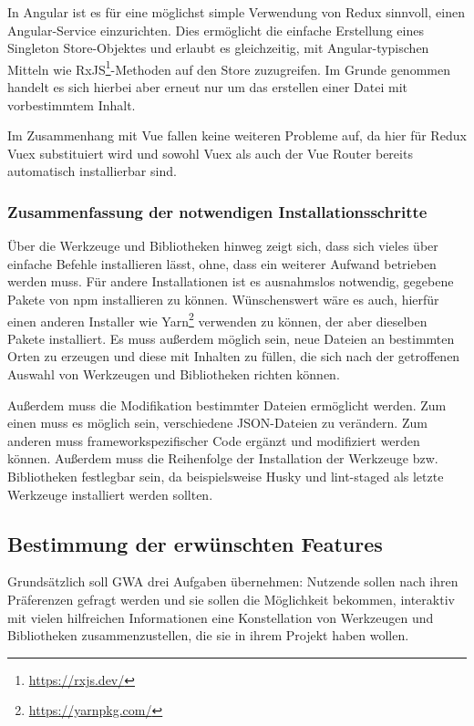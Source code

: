 In Angular ist es für eine möglichst simple Verwendung von Redux sinnvoll, einen Angular-Service einzurichten. Dies ermöglicht die einfache Erstellung eines Singleton Store-Objektes und erlaubt es gleichzeitig, mit Angular-typischen Mitteln wie RxJS\footnote{\url{https://rxjs.dev/}}-Methoden auf den Store zuzugreifen. Im Grunde genommen handelt es sich hierbei aber erneut nur um das erstellen einer Datei mit vorbestimmtem Inhalt.

Im Zusammenhang mit Vue fallen keine weiteren Probleme auf, da hier für Redux Vuex substituiert wird und sowohl Vuex als auch der Vue Router bereits automatisch installierbar sind.

\subsubsection{Zusammenfassung der notwendigen Installationsschritte}
Über die Werkzeuge und Bibliotheken hinweg zeigt sich, dass sich vieles über einfache Befehle installieren lässt, ohne, dass ein weiterer Aufwand betrieben werden muss. Für andere Installationen ist es ausnahmslos notwendig, gegebene Pakete von \gls{npm} installieren zu können. Wünschenswert wäre es auch, hierfür einen anderen Installer wie Yarn\footnote{\url{https://yarnpkg.com/}} verwenden zu können, der aber dieselben Pakete installiert. Es muss außerdem möglich sein, neue Dateien an bestimmten Orten zu erzeugen und diese mit Inhalten zu füllen, die sich nach der getroffenen Auswahl von Werkzeugen und Bibliotheken richten können.

Außerdem muss die Modifikation bestimmter Dateien ermöglicht werden. Zum einen muss es möglich sein, verschiedene \gls{JSON}-Dateien zu verändern. Zum anderen muss frameworkspezifischer Code ergänzt und modifiziert werden können. Außerdem muss die Reihenfolge der Installation der Werkzeuge bzw. Bibliotheken festlegbar sein, da beispielsweise Husky und lint-staged als letzte Werkzeuge installiert werden sollten.

\subsection{Bestimmung der erwünschten Features}
\label{konz:all_features}
Grundsätzlich soll \gls{GWA} drei Aufgaben übernehmen: Nutzende sollen nach ihren Präferenzen gefragt werden und sie sollen die Möglichkeit bekommen, interaktiv mit vielen hilfreichen Informationen eine Konstellation von Werkzeugen und Bibliotheken zusammenzustellen, die sie in ihrem Projekt haben wollen.

